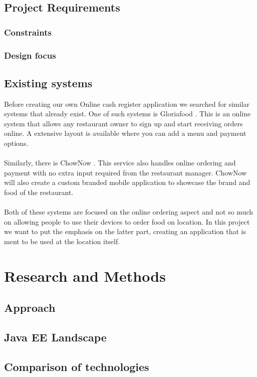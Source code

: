 \documentclass[12pt]{article}
\begin{document}
\subsection{Project Requirements}
\subsubsection{Constraints}

\subsubsection{Design focus}
\subsection{Existing systems}
Before creating our own Online cash register application we searched for similar systems that already exist. One of such systems is Gloriafood \cite{Gloriafood:online}. This is an online system that allows any restaurant owner to sign up and start receiving orders online. A extensive layout is available where you can add a menu and payment options.
\\\\
Similarly, there is ChowNow \cite{Chownow:online}. This service also handles online ordering and payment with no extra input required from the restaurant manager. ChowNow will also create a custom branded mobile application to showcase the brand and food of the restaurant.
\\\\
Both of these systems are focused on the online ordering aspect and not so much on allowing people to use their devices to order food on location. In this project we want to put the emphasis on the latter part, creating an application that is ment to be used at the location itself.



\section{Research and Methods}
\subsection{Approach}
\subsection{Java EE Landscape}
\subsection{Comparison of technologies}
\end{document}
